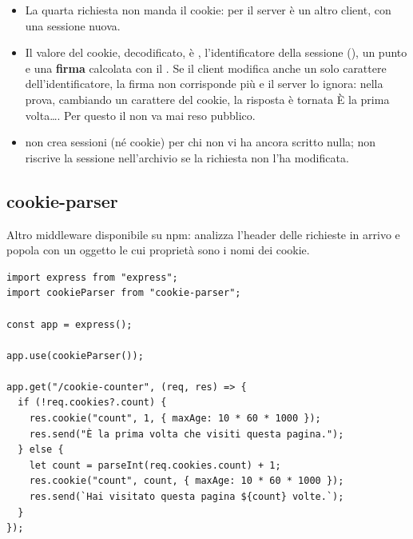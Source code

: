 \begin{itemize}
  \item La quarta richiesta non manda il cookie: per il server è un altro
        client, con una sessione nuova.
  \item Il valore del cookie, decodificato, è , l'identificatore
        della sessione (), un punto e una \textbf{firma}
        calcolata con il . Se il client modifica anche un solo
        carattere dell'identificatore, la firma non corrisponde più e il server
        lo ignora: nella prova, cambiando un carattere del cookie, la risposta è
        tornata \guillemotleft È la prima volta\ldots\guillemotright. Per
        questo il  non va mai reso pubblico.
  \item {} non crea sessioni (né cookie) per chi
        non vi ha ancora scritto nulla;  non riscrive la
        sessione nell'archivio se la richiesta non l'ha modificata.
\end{itemize}


\subsection{cookie-parser}

Altro middleware disponibile su npm: analizza l'header  delle
richieste in arrivo e popola  con un oggetto le cui proprietà
sono i nomi dei cookie.

\begin{affianco}[0.6][c]
\codicepiccolo
\begin{lstlisting}[style=js, name=cookies.js]
import express from "express";
import cookieParser from "cookie-parser";

const app = express();

app.use(cookieParser());

app.get("/cookie-counter", (req, res) => {
  if (!req.cookies?.count) {
    res.cookie("count", 1, { maxAge: 10 * 60 * 1000 });
    res.send("È la prima volta che visiti questa pagina.");
  } else {
    let count = parseInt(req.cookies.count) + 1;
    res.cookie("count", count, { maxAge: 10 * 60 * 1000 });
    res.send(`Hai visitato questa pagina ${count} volte.`);
  }
});
\end{lstlisting}
\risultato
\begin{immagine}
\end{immagine}
\end{affianco}


